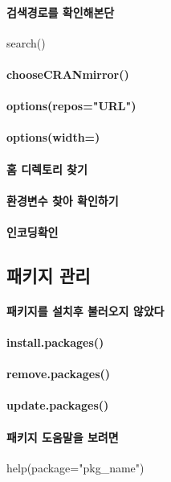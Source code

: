 \paragraph{검색경로를 확인해본단} search()
\paragraph{chooseCRANmirror()}
\paragraph{options(repos="URL")}
\paragraph{options(width=)}
\paragraph{홈 디렉토리 찾기}
\paragraph{환경변수 찾아 확인하기}
\paragraph{인코딩확인}



\subsection{패키지 관리}

\paragraph{패키지를 설치후 불러오지 않았다}
\paragraph{install.packages()}
\paragraph{remove.packages()}
\paragraph{update.packages()}
\paragraph{패키지 도움말을 보려면 } help(package="pkg_{name}")
